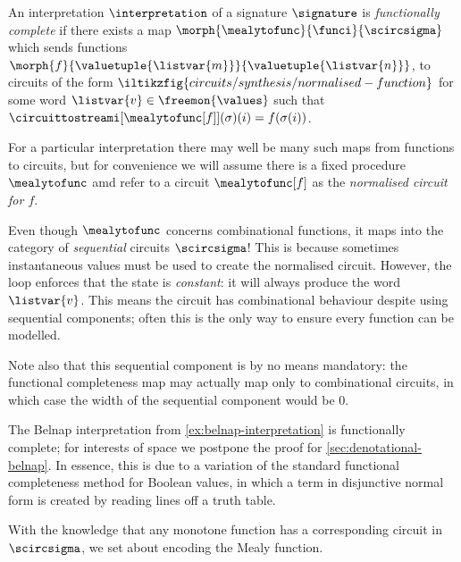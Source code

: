 \begin{definition}\label{def:functional-completeness}
    An interpretation \(\interpretation\) of a signature \(\signature\) is
    \emph{functionally complete} if there exists a map \(
    \morph{\mealytofunc}{\funci}{\scircsigma}
    \) which sends functions \(
    \morph{f}{\valuetuple{\listvar{m}}}{\valuetuple{\listvar{n}}}
    \), to circuits of the form \(
    \iltikzfig{circuits/synthesis/normalised-function}
    \) for some word \(\listvar{v} \in \freemon{\values}\) such that
    \(\circuittostreami[\mealytofunc[f]](\sigma)(i) = f(\sigma(i))\).
\end{definition}

For a particular interpretation there may well be many such maps from functions
to circuits, but for convenience we will assume there is a fixed procedure
\(\mealytofunc\) amd refer to a circuit \(\mealytofunc[f]\) as the
\emph{normalised circuit for \(f\)}.\

\begin{remark}
    Even though \(\mealytofunc\) concerns combinational functions, it maps into
    the category of \emph{sequential} circuits \(\scircsigma\)!
    This is because sometimes instantaneous values must be used to create the
    normalised circuit.
    However, the loop enforces that the state is \emph{constant}: it will always
    produce the word \(\listvar{v}\).
    This means the circuit has combinational behaviour despite using sequential
    components; often this is the only way to ensure every function can be
    modelled.

    Note also that this sequential component is by no means mandatory: the
    functional completeness map may actually map only to combinational circuits,
    in which case the width of the sequential component would be \(0\).
\end{remark}

\begin{example}
    The Belnap interpretation from \cref{ex:belnap-interpretation} is
    functionally complete; for interests of space we postpone the proof for
    \cref{sec:denotational-belnap}.
    In essence, this is due to a variation of the standard functional
    completeness method for Boolean values, in which a term in disjunctive
    normal form is created by reading lines off a truth table.
\end{example}

With the knowledge that any monotone function has a corresponding circuit
in \(\scircsigma\), we set about encoding the Mealy function.

